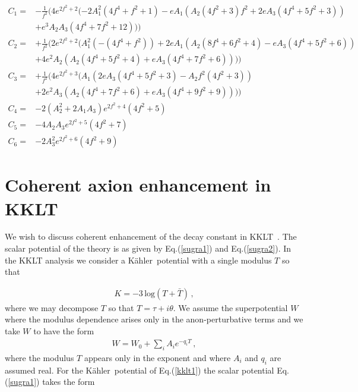 \documentclass[12pt]{article}
\newcommand{\bl}[1]{{\color{blue}{#1}}}
\def\K{K\"ahler~}
\begin{document}
\begin{align}
  C_1 = & - \frac{1}{f^2} (4  {e}^{2  {f}^{2} + 2}  ( - 2  {A}_{1}^{2}  \left( 4  {f}^{4} + {f}^{2} + 1 \right) - e  {A}_{1}  \left( {A}_{2}  \left( 4  {f}^{2} + 3 \right)  {f}^{2} + 2  e  {A}_{3}  \left( 4  {f}^{4} + 5  {f}^{2} + 3 \right) \right) \nonumber\\
        & + {e}^{3}  {A}_{2}  {A}_{3}  \left( 4  {f}^{4} + 7  {f}^{2} + 12 \right) ))\nonumber\\
  C_2=  & + \frac{1}{f^2}(2  {e}^{2  {f}^{2} + 2}  ( {A}_{1}^{2}  \left( - \left( 4  {f}^{4} + {f}^{2} \right) \right) + 2  e  {A}_{1}  \left( {A}_{2}  \left( 8  {f}^{4} + 6  {f}^{2} + 4 \right) - e  {A}_{3}  \left( 4  {f}^{4} + 5  {f}^{2} + 6 \right) \right) \nonumber\\
        & + 4  {e}^{2}  {A}_{2}  \left( {A}_{2}  \left( 4  {f}^{4} + 5  {f}^{2} + 4 \right) + e  {A}_{3}  \left( 4  {f}^{4} + 7  {f}^{2} + 6 \right) \right) ))\nonumber\\
  C_3=  & + \frac{1}{f^2}(4  {e}^{2  {f}^{2} + 3}  ( {A}_{1}  \left( 2  e  {A}_{3}  \left( 4  {f}^{4} + 5  {f}^{2} + 3 \right) - {A}_{2}  {f}^{2}  \left( 4  {f}^{2} + 3 \right) \right) \nonumber\\
        & + 2  {e}^{2}  {A}_{3}  \left( {A}_{2}  \left( 4  {f}^{4} + 7  {f}^{2} + 6 \right) + e  {A}_{3}  \left( 4  {f}^{4} + 9  {f}^{2} + 9 \right) \right) ))\nonumber\\
  C_4=  & - 2  \left( {A}_{2}^{2} + 2  {A}_{1}  {A}_{3} \right)  {e}^{2  {f}^{2} + 4}  \left( 4  {f}^{2} + 5 \right) \nonumber\\
  C_5=  & - 4  {A}_{2}  {A}_{3}  {e}^{2  {f}^{2} + 5}  \left( 4  {f}^{2} + 7 \right) \nonumber\\
  C_6=  & - 2  {A}_{3}^{2}  {e}^{2  {f}^{2} + 6}  \left( 4  {f}^{2} + 9 \right)
  \label{c1}
\end{align}
\bl{Max: Simulation part needs to be added here.}

\section{Coherent axion enhancement in KKLT\label{sec5}}
We wish to discuss coherent enhancement of the decay constant in KKLT~\cite{Kachru:2003aw}.
The scalar potential of the theory is as given by Eq.(\ref{sugra1}) and Eq.(\ref{sugra2}).
In the KKLT analysis we consider a \K potential with a single modulus $T$ so that

\begin{align}
  K = -3 \, \text{log}(T+ \bar T)\,,
  \label{kklt1}
\end{align}
where we may decompose $T$ so that
$T= \tau + i \theta$.
We assume  the superpotential $W$ where the modulus dependence arises only in the  anon-perturbative terms
and we take  $W$ to have the form
\begin{align}
  W= W_0 +\sum_{i} A_i  e^{- q_iT}\,,
  \label{w0A}
\end{align}
where the modulus $T$ appears only in the exponent and  where $A_i$ and $q_i$ are assumed real.
For the \K potential of Eq.(\ref{kklt1}) the scalar potential Eq. (\ref{sugra1}) takes the form
\end{document}
